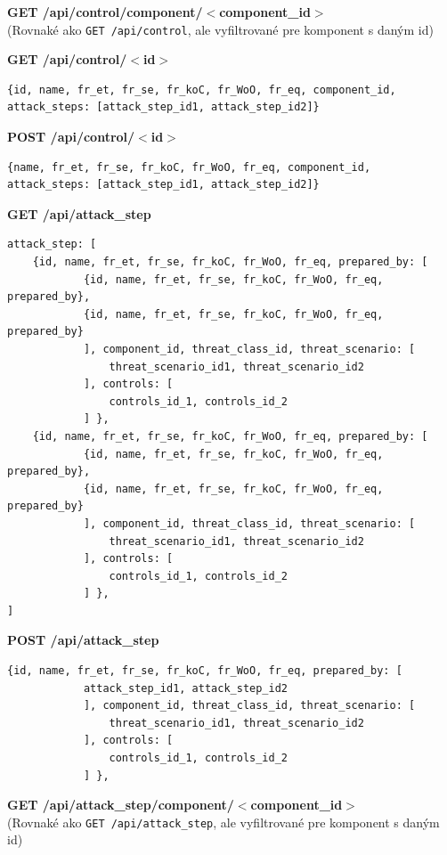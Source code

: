 \documentclass[11pt]{article}
\begin{document}
\vspace{1cm}
\textbf{GET /api/control/component/$<$component\_id$>$}\\ 
(Rovnaké ako \texttt{GET /api/control}, ale vyfiltrované pre komponent s daným id)

\vspace{1cm}
\textbf{GET /api/control/$<$id$>$} 
\begin{verbatim}
{id, name, fr_et, fr_se, fr_koC, fr_WoO, fr_eq, component_id, 
attack_steps: [attack_step_id1, attack_step_id2]}
\end{verbatim}

\vspace{1cm}
\textbf{POST /api/control/$<$id$>$} 
\begin{verbatim}
{name, fr_et, fr_se, fr_koC, fr_WoO, fr_eq, component_id, 
attack_steps: [attack_step_id1, attack_step_id2]}
\end{verbatim}

\vspace{1cm}
\textbf{GET /api/attack\_step} 
\begin{verbatim}
attack_step: [
	{id, name, fr_et, fr_se, fr_koC, fr_WoO, fr_eq, prepared_by: [
			{id, name, fr_et, fr_se, fr_koC, fr_WoO, fr_eq, prepared_by},
			{id, name, fr_et, fr_se, fr_koC, fr_WoO, fr_eq, prepared_by}
			], component_id, threat_class_id, threat_scenario: [
				threat_scenario_id1, threat_scenario_id2
			], controls: [
				controls_id_1, controls_id_2
			] },
	{id, name, fr_et, fr_se, fr_koC, fr_WoO, fr_eq, prepared_by: [
			{id, name, fr_et, fr_se, fr_koC, fr_WoO, fr_eq, prepared_by},
			{id, name, fr_et, fr_se, fr_koC, fr_WoO, fr_eq, prepared_by}
			], component_id, threat_class_id, threat_scenario: [
				threat_scenario_id1, threat_scenario_id2
			], controls: [
				controls_id_1, controls_id_2
			] },
]
\end{verbatim}

\vspace{1cm}
\textbf{POST /api/attack\_step} 
\begin{verbatim}
{id, name, fr_et, fr_se, fr_koC, fr_WoO, fr_eq, prepared_by: [
			attack_step_id1, attack_step_id2
			], component_id, threat_class_id, threat_scenario: [
				threat_scenario_id1, threat_scenario_id2
			], controls: [
				controls_id_1, controls_id_2
			] },
\end{verbatim}

\vspace{1cm}
\textbf{GET /api/attack\_step/component/$<$component\_id$>$}\\ 
(Rovnaké ako \texttt{GET /api/attack\_step}, ale vyfiltrované pre komponent s daným id)
\end{document}
